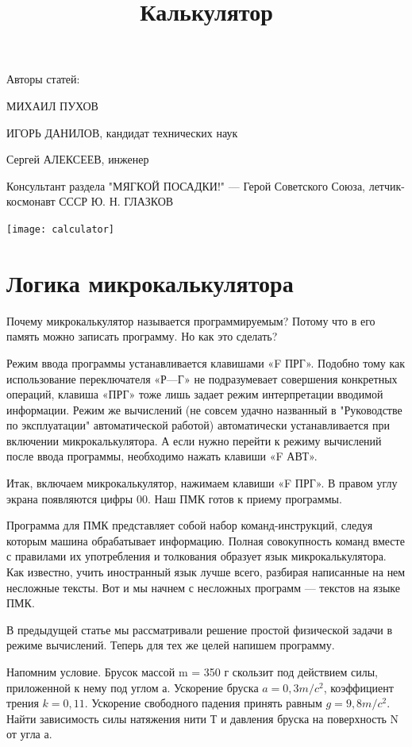 \documentclass[11pt,a4paper,oneside]{article}
\title{Калькулятор}
\begin{document}
\maketitle
\tableofcontents

Авторы статей:

МИХАИЛ ПУХОВ

ИГОРЬ ДАНИЛОВ, кандидат технических наук

Сергей АЛЕКСЕЕВ, инженер

Консультант раздела "МЯГКОЙ ПОСАДКИ!" — Герой Советского Союза, летчик-космонавт СССР Ю. Н. ГЛАЗКОВ
\pagebreak

\texttt{[image: calculator]}
\section{Логика микрокалькулятора}
Почему микрокалькулятор называется программируемым? Потому что в его память можно записать программу. Но как это сделать?

Режим ввода программы устанавливается клавишами «F ПРГ». Подобно тому как использование переключателя «Р—Г» не подразумевает совершения конкретных операций, клавиша «ПРГ» тоже лишь задает режим интерпретации вводимой информации. Режим же вычислений (не совсем удачно названный в "Руководстве по эксплуатации" автоматической работой) автоматически устанавливается при включении микрокалькулятора. А если нужно перейти к режиму вычислений после ввода программы, необходимо нажать клавиши «F АВТ».

Итак, включаем микрокалькулятор, нажимаем клавиши «F ПРГ». В правом углу экрана появляются цифры 00. Наш ПМК готов к приему программы.

Программа для ПМК представляет собой набор команд-инструкций, следуя которым машина обрабатывает информацию. Полная совокупность команд вместе с правилами их употребления и толкования образует язык микрокалькулятора. Как известно, учить иностранный язык лучше всего, разбирая написанные на нем несложные тексты. Вот и мы начнем с несложных программ — текстов на языке ПМК.

В предыдущей статье мы рассматривали решение простой физической задачи в режиме вычислений. Теперь для тех же целей напишем программу.

Напомним условие. Брусок массой m = 350 г скользит под действием силы, приложенной к нему под углом а. Ускорение бруска $a=0,3 m/c^{2}$, коэффициент трения $k=0,11$. Ускорение свободного падения принять равным $g=9,8 m/c^{2}$. Найти зависимость силы натяжения нити Т и давления бруска на поверхность N от угла а.
\end{document}
